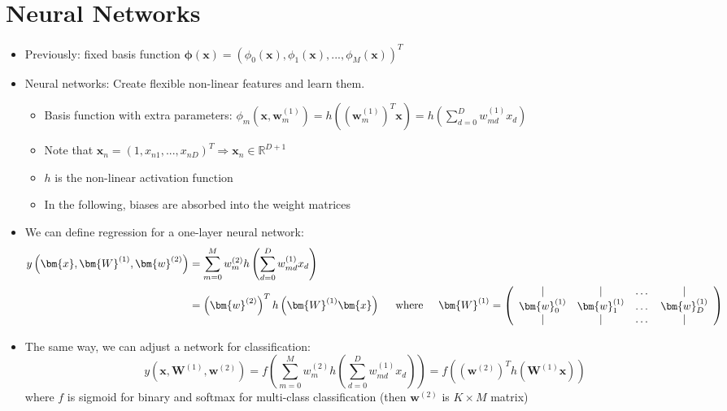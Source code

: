 \section{Neural Networks}
\begin{itemize}
	\item Previously: fixed basis function $\bm{\phi}(\bm{x}) = \left(\phi_0\left(\bm{x}\right), \phi_1\left(\bm{x}\right), ..., \phi_M\left(\bm{x}\right)\right)^T$
	\item Neural networks: Create flexible non-linear features and learn them. 
	\begin{itemize}
		\item Basis function with extra parameters: $\phi_m\left(\bm{x},\bm{w}_m^{(1)}\right) = h\left(\left(\bm{w}_m^{(1)}\right)^T \bm{x}\right) = h\left(\sum\limits_{d=0}^{D}w_{md}^{(1)}x_d\right)$ 
		\item Note that $\bm{x}_n = \left(1, x_{n1},...,x_{nD}\right)^T\Rightarrow \bm{x}_n \in \mathbb{R}^{D+1}$
		\item $h$ is the non-linear activation function
		\item In the following, biases are absorbed into the weight matrices
	\end{itemize}
	\item We can define regression for a one-layer neural network:
	\begin{equation*}
		\begin{split}
			y\left(\bm{x}, \bm{W}^{(1)}, \bm{w}^{(2)}\right) & = \sum\limits_{m=0}^{M} w_m^{(2)} h\left(\sum\limits_{d=0}^{D}w_{md}^{(1)}x_d\right) \\
			& = \left(\bm{w}^{(2)}\right)^T h\left(\bm{W}^{(1)} \bm{x}\right) \text{\hspace{5mm}where\hspace{5mm}} \bm{W}^{(1)} = \left(\begin{array}{cccc}
			\mid & \mid & \dots & \mid\\
			\bm{w}_0^{(1)} & \bm{w}_1^{(1)} & \dots & \bm{w}_D^{(1)}\\
			\mid & \mid & \dots & \mid
			\end{array}\right)\\
		\end{split}
	\end{equation*}
	\item The same way, we can adjust a network for classification:
	$$y\left(\bm{x}, \bm{W}^{(1)}, \bm{w}^{(2)}\right) = f\left(\sum\limits_{m=0}^{M} w_m^{(2)} h\left(\sum\limits_{d=0}^{D}w_{md}^{(1)}x_d\right)\right) = f\left(\left(\bm{w}^{(2)}\right)^T h\left(\bm{W}^{(1)} \bm{x}\right)\right)$$
	where $f$ is sigmoid for binary and softmax for multi-class classification (then $\bm{w}^{(2)}$ is $K\times M$ matrix)
\end{itemize}
